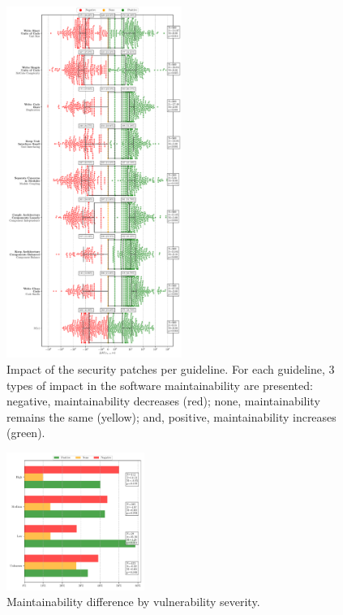 \documentclass[10pt,conference]{IEEEtran}
\begin{document}
 \begin{figure}[htp]
 	\vspace{-0.6cm}
     \begin{adjustwidth}{-1cm}{-1cm}  
  	\centering
  	\includegraphics[width=0.51\textwidth]{figures/main_per_guideline.pdf}
	\vspace{-0.4cm}
	
    \end{adjustwidth}
	
  	\caption{Impact of the security patches per guideline. For each guideline, $3$ types of impact 
	in the software maintainability are presented: negative, maintainability decreases (red); none, 
	maintainability remains the same (yellow); and, positive, maintainability increases (green).}
 	\label{fig:guidelines}	
	\vspace{-0.7cm}
 \end{figure}
 
 \begin{figure}[htp]
 	\vspace{-0.6cm}
  	\centering 	
 	\includegraphics[width=0.4\textwidth]{figures/main_per_severity.pdf}
 	\vspace{-0.3cm}
  	\caption{Maintainability difference by vulnerability severity.}
 	\label{fig:severity}
 	\vspace{-0.5cm}
 \end{figure}
\end{document}
